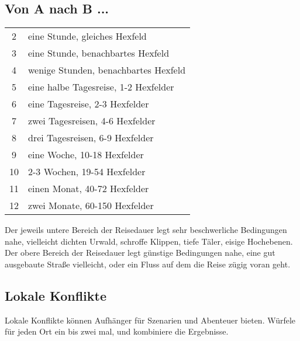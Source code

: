\subsection{Von A nach B ...}

\begin{tabularx}{\columnwidth}{cZ}
2 & eine Stunde, gleiches Hexfeld\\
3 & eine Stunde, benachbartes Hexfeld\\
4 & wenige Stunden, benachbartes Hexfeld\\
5 & eine halbe Tagesreise, 1-2 Hexfelder\\
6 & eine Tagesreise, 2-3 Hexfelder\\
7 & zwei Tagesreisen, 4-6 Hexfelder\\
8 & drei Tagesreisen, 6-9 Hexfelder\\
9 & eine Woche, 10-18 Hexfelder\\
10 & 2-3 Wochen, 19-54 Hexfelder\\
11 & einen Monat, 40-72 Hexfelder\\
12 & zwei Monate, 60-150 Hexfelder\\
\end{tabularx}

Der jeweils untere Bereich der Reisedauer legt sehr beschwerliche
Bedingungen nahe, vielleicht dichten Urwald, schroffe Klippen, tiefe
Täler, eisige Hochebenen. Der obere Bereich der Reisedauer legt günstige
Bedingungen nahe, eine gut ausgebaute Straße vielleicht, oder ein Fluss
auf dem die Reise zügig voran geht.

\subsection{Lokale Konflikte}

Lokale Konflikte können Aufhänger für Szenarien und Abenteuer
bieten. Würfele für jeden Ort ein bis zwei mal, und kombiniere die
Ergebnisse.

